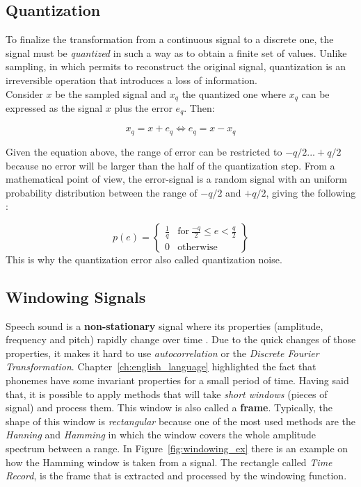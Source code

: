 \subsection{Quantization}
\label{subs:quantization}
To finalize the transformation from a continuous signal to a discrete one, the signal must be \textit{quantized} in such a way as to obtain a finite set of values. Unlike sampling, in which permits to reconstruct the original signal, quantization is an irreversible operation that introduces a loss of information. \\
\noindent Consider $x$ be the sampled signal and $x_{q}$ the quantized one where $x_{q}$ can be expressed as the signal $x$ plus the error $e_{q}$. Then:

\begin{equation}
x_{q} = x + e_{q} \Leftrightarrow e_{q} = x - x_{q}
\end{equation}

\noindent Given the equation above, the range of error can be restricted to $-q/2 ... +q/2$ because no error will be larger than the half of the quantization step. From a mathematical point of view, the error-signal is a random signal with an uniform probability distribution between the range of $−q/2 $ and $ +q/2$, giving the following \cite{quantization_math}:

\begin{equation}
p(e) = \begin{Bmatrix}
			\frac{1}{q} & \text{for}\ \frac{-q}{2} \leq  e < \frac{q}{2}\\
			0 			& \text{otherwise}
		\end{Bmatrix}
\end{equation}
This is why the quantization error also called quantization noise.

\subsection{Windowing Signals}
\label{ssubs:windowing_signals}
Speech sound is a \textbf{non-stationary} signal where its properties (amplitude, frequency and pitch) rapidly change over time \cite{windowing_fi}. Due to the quick changes of those properties, it makes it hard to use \textit{autocorrelation} or the \textit{Discrete Fourier Transformation}. Chapter~\ref{ch:english_language} highlighted the fact that phonemes have some invariant properties for a small period of time. Having said that, it is possible to apply methods that will take \textit{short windows} (pieces of signal) and process them. This window is also called a \textbf{frame}. Typically, the shape of this window is \textit{rectangular} because one of the most used methods are the \textit{Hanning} and \textit{Hamming} in which the window covers the whole amplitude spectrum between a range. In Figure~\ref{fig:windowing_ex} there is an example on how the Hamming window is taken from a signal. The rectangle called \textit{Time Record}, is the frame that is extracted and processed by the windowing function.

